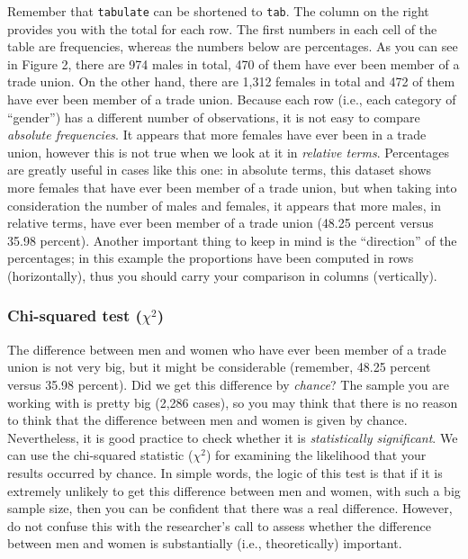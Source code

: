 Remember that \texttt{tabulate} can be shortened to \texttt{tab}. The column on the right provides you with the total for each row. The first numbers in each cell of the table are frequencies, whereas the numbers below are percentages. As you can see in Figure 2, there are 974 males in total, 470 of them have ever been member of a trade union. On the other hand, there are 1,312 females in total and 472 of them have ever been member of a trade union. Because each row (i.e., each category of ``gender'') has a different number of observations, it is not easy to compare \textit{absolute frequencies}. It appears that more females have ever been in a trade union, however this is not true when we look at it in \textit{relative terms}. Percentages are greatly useful in cases like this one: in absolute terms, this dataset shows more females that have ever been member of a trade union, but when taking into consideration the number of males and females, it appears that more males, in relative terms, have ever been member of a trade union (48.25 percent versus 35.98 percent). Another important thing to keep in mind is the ``direction'' of the percentages; in this example the proportions have been computed in rows (horizontally), thus you should carry your comparison in columns (vertically).

\subsubsection*{Chi-squared test ($\chi^2$)}

The difference between men and women who have ever been member of a trade union is not very big, but it might be considerable (remember, 48.25 percent versus 35.98 percent). Did we get this difference by \textit{chance}? The sample you are working with is pretty big (2,286 cases), so you may think that there is no reason to think that the difference between men and women is given by chance. Nevertheless, it is good practice to check whether it is \textit{statistically significant}. We can use the chi-squared statistic ($\chi^2$) for examining the likelihood that your results occurred by chance. In simple words, the logic of this test is that if it is extremely unlikely to get this difference between men and women, with such a big sample size, then you can be confident that there was a real difference. However, do not confuse this with the researcher's call to assess whether the difference between men and women is substantially (i.e., theoretically) important.

